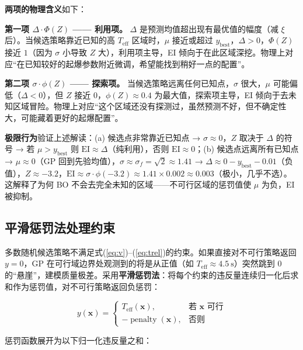 \documentclass[12pt,a4paper]{ctexart}
\newcommand{\Teff}{T_{\text{eff}}}
\newcommand{\EI}{\mathrm{EI}}
\begin{document}
\textbf{两项的物理含义}如下：

\textbf{第一项 $\Delta \cdot \Phi(Z)$ —— 利用项。} $\Delta$ 是预测均值超出现有最优值的幅度（减 $\xi$ 后）。当候选策略靠近已知的高 $\Teff$ 区域时，$\mu$ 接近或超过 $y_{\text{best}}$，$\Delta > 0$，$\Phi(Z)$ 接近 $1$（因为 $\sigma$ 小导致 $Z$ 大），利用项主导，EI 倾向于在此区域深挖。物理上对应``在已知较好的起爆参数附近微调，希望能找到稍好一点的配置''。

\textbf{第二项 $\sigma \cdot \phi(Z)$ —— 探索项。} 当候选策略远离任何已知点，$\sigma$ 很大，$\mu$ 可能偏低（$\Delta < 0$），但 $Z$ 接近 0，$\phi(Z) \approx 0.4$ 为最大值，探索项主导，EI 倾向于去未知区域冒险。物理上对应``这个区域还没有探测过，虽然预测不好，但不确定性大，可能藏着更好的起爆配置''。

\textbf{极限行为}验证上述解读：(a) 候选点非常靠近已知点 → $\sigma \approx 0$，$Z$ 取决于 $\Delta$ 的符号 → 若 $\mu > y_{\text{best}}$ 则 $\EI \approx \Delta$（纯利用），否则 $\EI \approx 0$；(b) 候选点远离所有已知点 → $\mu \approx 0$（GP 回到先验均值），$\sigma \approx \sigma_f = \sqrt{2} \approx 1.41$ → $\Delta \approx 0 - y_{\text{best}} - 0.01$（负值），$Z \approx -3.2$，$\EI \approx \sigma \cdot \phi(-3.2) \approx 1.41 \times 0.002 \approx 0.003$（极小，几乎不选）。这解释了为何 BO 不会去完全未知的区域——不可行区域的惩罚值使 $\mu$ 为负，EI 被抑制。

\subsection{平滑惩罚法处理约束}

多数随机候选策略不满足式(\ref{eq:v})--(\ref{eq:trel})的约束。如果直接对不可行策略返回 $y = 0$，GP 在可行域边界处观测到的将是从正值（如 $\Teff \approx 4.5\ \mathrm{s}$）突然跳到 $0$ 的``悬崖''，建模质量极差。采用\textbf{平滑惩罚法}：将每个约束的违反量连续归一化后求和作为惩罚值，对不可行策略返回负惩罚：

\begin{equation}
\boxed{y(\mathbf{x}) = \begin{cases}
\Teff(\mathbf{x}), & \text{若 } \mathbf{x} \text{ 可行} \\[8pt]
-\operatorname{penalty}(\mathbf{x}), & \text{否则}
\end{cases}}
\label{eq:penalty}
\end{equation}

惩罚函数展开为以下归一化违反量之和：
\end{document}
